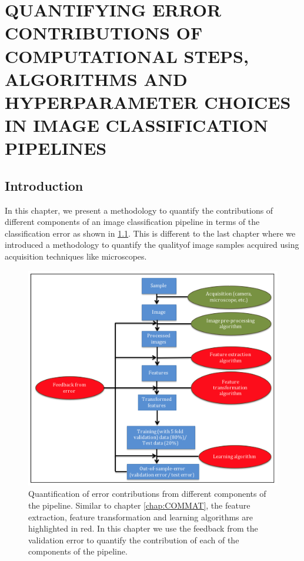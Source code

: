 \chapter{QUANTIFYING ERROR CONTRIBUTIONS OF COMPUTATIONAL STEPS, ALGORITHMS AND HYPERPARAMETER CHOICES IN IMAGE CLASSIFICATION PIPELINES}
\label{chap:EP}

\let\thefootnote\relax{}

\section{Introduction} 
\label{sec1}
In this chapter, we present a methodology to quantify the contributions of different components of an image classification pipeline in terms of the classification error as shown in \ref{fig:chapter5}. This is different to the last chapter where we introduced a methodology to quantify the qualityof image samples acquired using acquisition techniques like microscopes. 

\begin{figure}[ht!]
\centering
\includegraphics[width=1.0\textwidth]{img/chapter5}
\caption{Quantification of error contributions from different components of the pipeline. Similar to  chapter \ref{chap:COMMAT}, the feature extraction, feature transformation and learning algorithms are highlighted in red. In this chapter we use the feedback from the validation error to quantify the contribution of each of the components of the pipeline.}
\label{fig:chapter5}
\end{figure}


